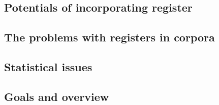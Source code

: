\subsection{Potentials of incorporating register}



\subsection{The problems with registers in corpora}


\subsection{Statistical issues}



\subsection{Goals and overview}

\cite[vgl.][33--36]{Mueller2010}



\newpage
